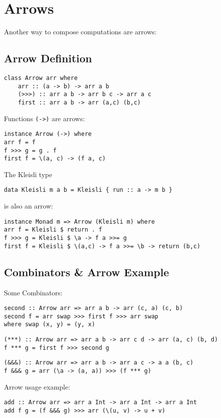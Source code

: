 \section{Arrows}
Another way to compose computations are arrows:
\subsection{Arrow Definition}
\begin{lstlisting}[frame=htrbl]
class Arrow arr where
	arr :: (a -> b) -> arr a b
	(>>>) :: arr a b -> arr b c -> arr a c
	first :: arr a b -> arr (a,c) (b,c)
\end{lstlisting}

Functions \lstinline{(->)} are arrows:
\begin{lstlisting}[frame=htrbl]
instance Arrow (->) where
arr f = f
f >>> g = g . f
first f = \(a, c) -> (f a, c)
\end{lstlisting}
\frbreak
The Kleisli type
\begin{lstlisting}[frame=htrbl]
data Kleisli m a b = Kleisli { run :: a -> m b }
\end{lstlisting}
is also an arrow:
\begin{lstlisting}[frame=htrbl]
instance Monad m => Arrow (Kleisli m) where
arr f = Kleisli $ return . f
f >>> g = Kleisli $ \a -> f a >>= g
first f = Kleisli $ \(a,c) -> f a >>= \b -> return (b,c)
\end{lstlisting}

\frbreak
\subsection{Combinators \& Arrow Example}
Some Combinators:
\begin{lstlisting}[frame=htrbl]
second :: Arrow arr => arr a b -> arr (c, a) (c, b)
second f = arr swap >>> first f >>> arr swap
where swap (x, y) = (y, x)
\end{lstlisting}
\begin{lstlisting}[frame=htrbl]
(***) :: Arrow arr => arr a b -> arr c d -> arr (a, c) (b, d)
f *** g = first f >>> second g
\end{lstlisting}
\begin{lstlisting}[frame=htrbl]
(&&&) :: Arrow arr => arr a b -> arr a c -> a a (b, c)
f &&& g = arr (\a -> (a, a)) >>> (f *** g)
\end{lstlisting}

Arrow usage example:
\begin{lstlisting}[frame=htrbl]
add :: Arrow arr => arr a Int -> arr a Int -> arr a Int
add f g = (f &&& g) >>> arr (\(u, v) -> u + v)
\end{lstlisting}
\frbreak